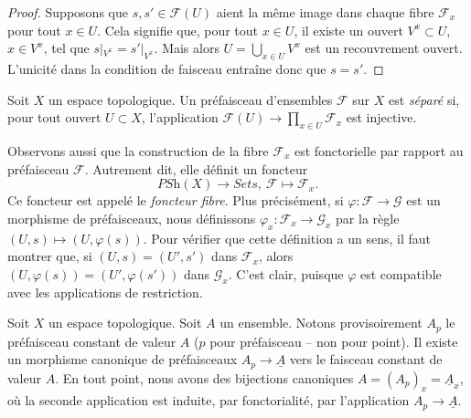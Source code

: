 \begin{proof}
Supposons que $s, s' \in \mathcal{F}(U)$ aient la même image
dans chaque fibre $\mathcal{F}_x$ pour tout $x \in U$. Cela signifie que,
pour tout $x \in U$, il existe un ouvert $V^x \subset U$,
$x \in V^x$, tel que $s|_{V^x} = s'|_{V^x}$. Mais alors
$U = \bigcup_{x \in U} V^x$ est un recouvrement ouvert. L'unicité
dans la condition de faisceau entraîne donc que $s = s'$.
\end{proof}

\begin{definition}
\label{definition-separated}
Soit $X$ un espace topologique.
Un préfaisceau d'ensembles $\mathcal{F}$ sur $X$ est {\it séparé}
si, pour tout ouvert $U \subset X$, l'application
$\mathcal{F}(U) \to \prod_{x \in U} \mathcal{F}_x$ est
injective.
\end{definition}

\noindent
Observons aussi que la construction de la fibre
$\mathcal{F}_x$ est fonctorielle par rapport au préfaisceau $\mathcal{F}$.
Autrement dit, elle définit un foncteur
$$
\textit{PSh}(X) \longrightarrow \textit{Sets},
\ \mathcal{F} \longmapsto \mathcal{F}_x.
$$
Ce foncteur est appelé le {\it foncteur fibre}.
Plus précisément, si $\varphi : \mathcal{F} \to \mathcal{G}$ est
un morphisme de préfaisceaux, nous définissons
$\varphi_x : \mathcal{F}_x \to \mathcal{G}_x$
par la règle $(U, s) \mapsto (U, \varphi(s))$.
Pour vérifier que cette définition a un sens, il faut montrer que,
si $(U, s) = (U', s')$ dans $\mathcal{F}_x$, alors
$(U, \varphi(s)) = (U', \varphi(s'))$ dans $\mathcal{G}_x$.
C'est clair, puisque $\varphi$ est compatible avec les
applications de restriction.

\begin{example}
\label{example-stalk-constant-presheaf}
Soit $X$ un espace topologique. Soit $A$ un ensemble.
Notons provisoirement $A_p$ le préfaisceau constant
de valeur $A$ ($p$ pour préfaisceau -- non pour point).
Il existe un morphisme canonique de préfaisceaux
$A_p \to \underline{A}$ vers le faisceau constant de
valeur $A$. En tout point, nous avons des
bijections canoniques $A = (A_p)_x = \underline{A}_x$, où
la seconde application est induite, par fonctorialité, par
l'application $A_p \to \underline{A}$.
\end{example}



